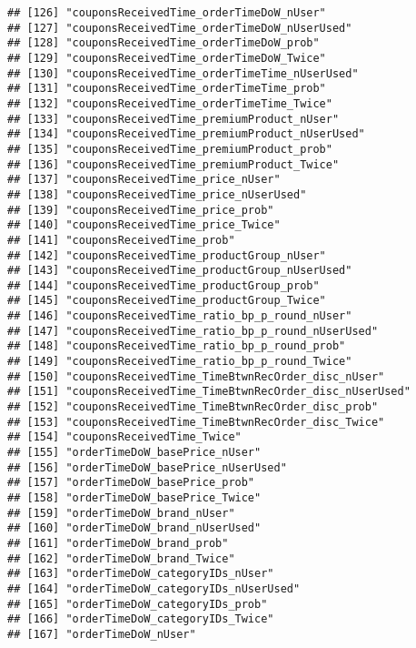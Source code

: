 \documentclass[10pt]{report}
\begin{document}
\begin{verbatim}
## [126] "couponsReceivedTime_orderTimeDoW_nUser"             
## [127] "couponsReceivedTime_orderTimeDoW_nUserUsed"         
## [128] "couponsReceivedTime_orderTimeDoW_prob"              
## [129] "couponsReceivedTime_orderTimeDoW_Twice"             
## [130] "couponsReceivedTime_orderTimeTime_nUserUsed"        
## [131] "couponsReceivedTime_orderTimeTime_prob"             
## [132] "couponsReceivedTime_orderTimeTime_Twice"            
## [133] "couponsReceivedTime_premiumProduct_nUser"           
## [134] "couponsReceivedTime_premiumProduct_nUserUsed"       
## [135] "couponsReceivedTime_premiumProduct_prob"            
## [136] "couponsReceivedTime_premiumProduct_Twice"           
## [137] "couponsReceivedTime_price_nUser"                    
## [138] "couponsReceivedTime_price_nUserUsed"                
## [139] "couponsReceivedTime_price_prob"                     
## [140] "couponsReceivedTime_price_Twice"                    
## [141] "couponsReceivedTime_prob"                           
## [142] "couponsReceivedTime_productGroup_nUser"             
## [143] "couponsReceivedTime_productGroup_nUserUsed"         
## [144] "couponsReceivedTime_productGroup_prob"              
## [145] "couponsReceivedTime_productGroup_Twice"             
## [146] "couponsReceivedTime_ratio_bp_p_round_nUser"         
## [147] "couponsReceivedTime_ratio_bp_p_round_nUserUsed"     
## [148] "couponsReceivedTime_ratio_bp_p_round_prob"          
## [149] "couponsReceivedTime_ratio_bp_p_round_Twice"         
## [150] "couponsReceivedTime_TimeBtwnRecOrder_disc_nUser"    
## [151] "couponsReceivedTime_TimeBtwnRecOrder_disc_nUserUsed"
## [152] "couponsReceivedTime_TimeBtwnRecOrder_disc_prob"     
## [153] "couponsReceivedTime_TimeBtwnRecOrder_disc_Twice"    
## [154] "couponsReceivedTime_Twice"                          
## [155] "orderTimeDoW_basePrice_nUser"                       
## [156] "orderTimeDoW_basePrice_nUserUsed"                   
## [157] "orderTimeDoW_basePrice_prob"                        
## [158] "orderTimeDoW_basePrice_Twice"                       
## [159] "orderTimeDoW_brand_nUser"                           
## [160] "orderTimeDoW_brand_nUserUsed"                       
## [161] "orderTimeDoW_brand_prob"                            
## [162] "orderTimeDoW_brand_Twice"                           
## [163] "orderTimeDoW_categoryIDs_nUser"                     
## [164] "orderTimeDoW_categoryIDs_nUserUsed"                 
## [165] "orderTimeDoW_categoryIDs_prob"                      
## [166] "orderTimeDoW_categoryIDs_Twice"                     
## [167] "orderTimeDoW_nUser"                                 

\end{verbatim}
\end{document}

